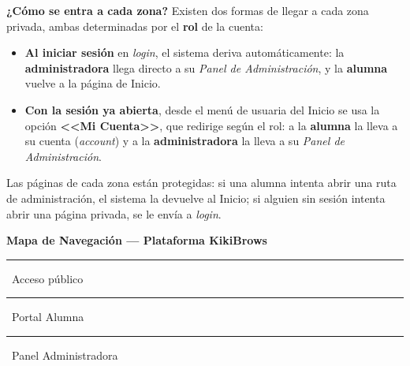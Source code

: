 \documentclass[a4paper,11pt]{article}
\begin{document}
\begin{infobox}
\textbf{\textcolor{mainblack}{¿C\'omo se entra a cada zona?}}
Existen dos formas de llegar a cada zona privada, ambas determinadas por el
\textbf{rol} de la cuenta:
\begin{itemize}[leftmargin=1.6em, itemsep=3pt, topsep=2pt]
  \item \textbf{Al iniciar sesi\'on} en \emph{login}, el sistema deriva
        autom\'aticamente: la \textbf{administradora} llega directo a su
        \emph{Panel de Administraci\'on}, y la \textbf{alumna} vuelve a la
        p\'agina de Inicio.
  \item \textbf{Con la sesi\'on ya abierta}, desde el men\'u de usuaria del Inicio
        se usa la opci\'on \textbf{<<Mi Cuenta>>}, que redirige seg\'un el rol:
        a la \textbf{alumna} la lleva a su cuenta (\emph{account}) y a la
        \textbf{administradora} la lleva a su \emph{Panel de Administraci\'on}.
\end{itemize}
Las p\'aginas de cada zona est\'an protegidas: si una alumna intenta abrir una
ruta de administraci\'on, el sistema la devuelve al Inicio; si alguien sin sesi\'on
intenta abrir una p\'agina privada, se le env\'ia a \emph{login}.
\end{infobox}

\newpage
{\large\bfseries\color{mainblack}Mapa de Navegaci\'on --- Plataforma KikiBrows}

\vspace{4pt}
{\small\color{midgray}
  \textcolor{checkgreen!70!black}{\rule{7mm}{3pt}}~Acceso p\'ublico\quad
  \textcolor{blue!50!black}{\rule{7mm}{3pt}}~Portal Alumna\quad
  \textcolor{gold}{\rule{7mm}{3pt}}~Panel Administradora
}

\vspace{10pt}
\end{document}
